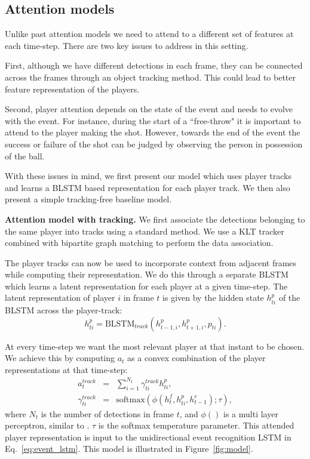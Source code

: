 \subsection{Attention models}
Unlike past attention models \cite{Bahdnau_arxiv14,Xu_arxiv15,Yao_arxiv15} we need to attend to a different set of
features at each time-step. There are two key issues to address in this
setting.

First, although we have different detections in each frame, they
can be connected across the frames through an object tracking
method. This could lead to better feature representation of the
players.

Second, player attention depends on the state of the event and needs to evolve
with the event.  For instance, during the start of a ``free-throw" it is
important to attend to the player making the shot. However, towards the end of
the event the success or failure of the shot can be judged by observing the
person in possession of the ball.

With these issues in mind, we first present our model which uses player tracks
and learns a BLSTM based representation for each player track. We then
also
present a simple tracking-free baseline model.

\noindent \textbf{Attention model with tracking.}
We first associate the detections
belonging to the same player into tracks using a standard
method. We use a KLT tracker combined with
bipartite graph matching \cite{Munkres_1957} to perform the data association.

The player tracks can now be used to incorporate context
from adjacent frames while computing their representation.
We do this through a separate BLSTM which learns a latent
representation for each player at a given time-step.
The latent representation of player $i$ in frame $t$ is
given by the hidden state
$h_{ti}^p$ of the BLSTM across the player-track:
\[
  h_{ti}^p = \mbox{BLSTM}_{track}(h_{t-1,i}^p, h_{t+1,i}^p, p_{ti}).
\]

At every time-step we want the most relevant player at that
instant to be chosen. We achieve this by computing
$a_t$ as a convex combination of the player representations
at that time-step:
\begin{eqnarray} 
\label{eq:track}
  a_t^{track} & = & \sum_{i=1}^{N_t} \gamma_{ti}^{track} h_{ti}^p, \\ \nonumber
  \gamma_{ti}^{track} & = & \text{softmax} \left(\phi\left(h^f_t, h^p_{ti}, h^e_{t-1}\right); \tau\right),
\end{eqnarray}where $N_t$ is the number of detections in frame $t$, and $\phi()$ is a 
multi layer perceptron, similar to \cite{Bahdnau_arxiv14}. $\tau$ is the softmax temperature parameter.
This attended player representation is input to the
unidirectional event recognition LSTM in Eq.~\ref{eq:event_lstm}.
This model is illustrated in Figure~\ref{fig:model}.

